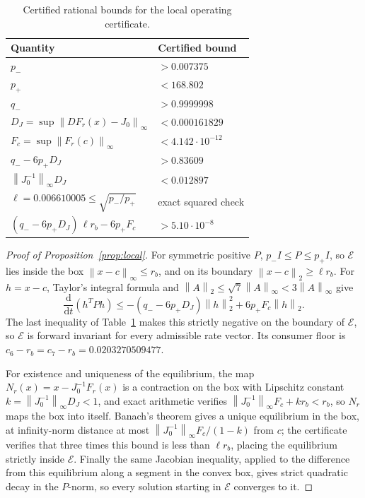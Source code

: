 \documentclass[11pt,a4paper]{article}
\theoremstyle{plain}
\theoremstyle{definition}
\theoremstyle{remark}
\newcommand{\cE}{\mathcal E}
\newcommand{\norm}[1]{\left\lVert#1\right\rVert}
\newcommand{\dd}{\mathrm d}
\begin{document}
\begin{table}[htbp]
\centering
\caption{Certified rational bounds for the local operating certificate.}
\label{tab:certificate}
\begin{tabular}{ll}\toprule
Quantity&Certified bound\\\midrule
$p_-$&$>0.007375$\\
$p_+$&$<168.802$\\
$q_-$&$>0.9999998$\\
$D_J=\sup\norm{DF_r(x)-J_0}_\infty$&$<0.000161829$\\
$F_c=\sup\norm{F_r(c)}_\infty$&$<4.142\cdot10^{-12}$\\
$q_--6p_+D_J$&$>0.83609$\\
$\norm{J_0^{-1}}_\infty D_J$&$<0.012897$\\
$\ell=0.006610005\le\sqrt{p_-/p_+}$&exact squared check\\
$(q_--6p_+D_J)\,\ell r_b-6p_+F_c$&$>5.10\cdot10^{-8}$\\\bottomrule
\end{tabular}
\end{table}

\begin{proof}[Proof of Proposition~\ref{prop:local}]
For symmetric positive $P$, $p_-I\le P\le p_+I$, so $\cE$ lies inside the box $\norm{x-c}_\infty\le r_b$, and on its boundary $\norm{x-c}_2\ge\ell r_b$. For $h=x-c$, Taylor's integral formula and $\norm A_2\le\sqrt7\norm A_\infty<3\norm A_\infty$ give
\[
\frac{\dd}{\dd t}(h^TPh)\le-(q_--6p_+D_J)\norm h_2^2+6p_+F_c\norm h_2 .
\]
The last inequality of Table~\ref{tab:certificate} makes this strictly negative on the boundary of $\cE$, so $\cE$ is forward invariant for every admissible rate vector. Its consumer floor is $c_6-r_b=c_7-r_b=0.0203270509477$.

For existence and uniqueness of the equilibrium, the map $N_r(x)=x-J_0^{-1}F_r(x)$ is a contraction on the box with Lipschitz constant $k=\norm{J_0^{-1}}_\infty D_J<1$, and exact arithmetic verifies $\norm{J_0^{-1}}_\infty F_c+kr_b<r_b$, so $N_r$ maps the box into itself. Banach's theorem gives a unique equilibrium in the box, at infinity-norm distance at most $\norm{J_0^{-1}}_\infty F_c/(1-k)$ from $c$; the certificate verifies that three times this bound is less than $\ell r_b$, placing the equilibrium strictly inside $\cE$. Finally the same Jacobian inequality, applied to the difference from this equilibrium along a segment in the convex box, gives strict quadratic decay in the $P$-norm, so every solution starting in $\cE$ converges to it.
\end{proof}
\end{document}
